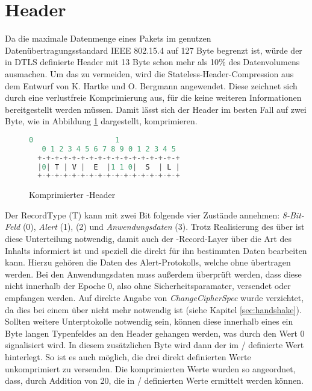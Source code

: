 \section{Header}
\label{sec:headercompression}

Da die maximale Datenmenge eines Pakets im genutzen Datenübertragungsstandard IEEE 802.15.4 \cite{ieee802154} auf 127 Byte begrenzt ist, würde der in DTLS
definierte Header mit 13 Byte schon mehr als 10\% des Datenvolumens ausmachen. Um das zu vermeiden, wird die Stateless-Header-Compression aus dem Entwurf
von K. Hartke und O. Bergmann \cite[Kapitel 3]{draftcodtls} angewendet. Diese zeichnet sich durch eine verlustfreie Komprimierung aus, für die keine weiteren
Informationen bereitgestellt werden müssen. Damit lässt sich der Header im besten Fall auf zwei Byte, wie in Abbildung \ref{fig:com_handshake_header} dargestellt,
komprimieren.

\begin{figure}[ht]
  \centering
  \begin{lstlisting}[language=c]
   0                   1
   0 1 2 3 4 5 6 7 8 9 0 1 2 3 4 5
  +-+-+-+-+-+-+-+-+-+-+-+-+-+-+-+-+
  |0| T | V |  E  |1 1 0|  S  | L |
  +-+-+-+-+-+-+-+-+-+-+-+-+-+-+-+-+
  \end{lstlisting}
  \caption{Komprimierter -Header}
  \label{fig:com_handshake_header}
\end{figure}

Der RecordType (T) kann mit zwei Bit folgende vier Zustände annehmen: \textit{8-Bit-Feld} (0), \textit{Alert} (1), \textit{} (2) und
\textit{Anwendungsdaten} (3). Trotz Realisierung des  über  ist diese Unterteilung notwendig, damit auch der -Record-Layer über die
Art des Inhalts informiert ist und speziell die direkt für ihn bestimmten Daten bearbeiten kann. Hierzu gehören die Daten des Alert-Protokolls,
welche ohne  übertragen werden. Bei den Anwendungsdaten muss außerdem überprüft werden, dass diese nicht innerhalb der Epoche 0, also ohne
Sicherheitsparamater, versendet oder empfangen werden. Auf direkte Angabe von \textit{ChangeCipherSpec} wurde verzichtet, da dies bei einem
 über  nicht mehr notwendig ist (siehe Kapitel \ref{sec:handshake}). Sollten  weitere Unterptokolle notwendig sein, können
diese innerhalb eines ein Byte langen Typenfeldes an den Header gehangen werden, was durch den Wert 0 signalisiert wird. In diesem zusätzlichen
Byte wird dann der im / definierte Wert hinterlegt. So ist es auch möglich, die drei direkt definierten Werte unkomprimiert zu
versenden. Die komprimierten Werte wurden so angeordnet, dass, durch Addition von 20, die in / definierten Werte ermittelt werden können.

